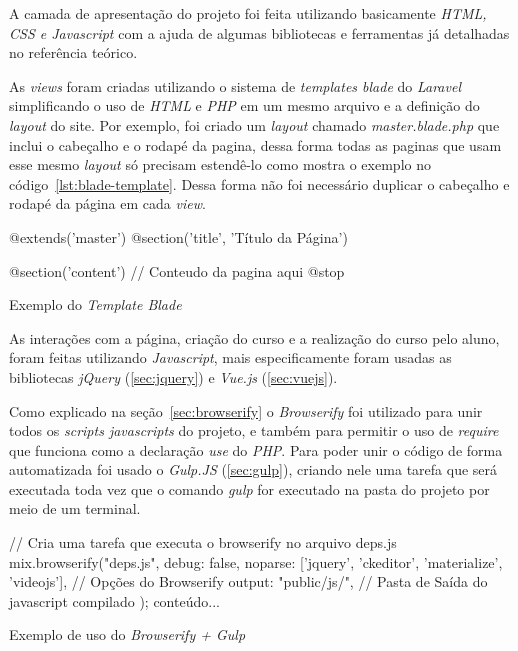 A camada de apresentação do projeto foi feita utilizando basicamente \textit{HTML, CSS e Javascript} com a ajuda de algumas bibliotecas e ferramentas já detalhadas no referência teórico.

As \textit{views} foram criadas utilizando o sistema de \textit{templates blade} do \textit{Laravel} simplificando o uso de \textit{HTML} e \textit{PHP} em um mesmo arquivo e a definição do \textit{layout} do site. Por exemplo, foi criado um \textit{layout} chamado \textit{master.blade.php} que inclui o cabeçalho e o rodapé da pagina, dessa forma todas as paginas que usam esse mesmo \textit{layout} só precisam estendê-lo como mostra o exemplo no código~\ref{lst:blade-template}. Dessa forma não foi necessário duplicar o cabeçalho e rodapé da página em cada \textit{view}.

\begin{listing}
    \begin{phpcode}
        @extends('master')
        @section('title', 'Título da Página')
        
        @section('content')
        // Conteudo da pagina aqui
        @stop
    \end{phpcode}
    \caption{Exemplo do \textit{Template Blade}}
    \label{lst:blade-template}
\end{listing}

As interações com a página, criação do curso e a realização do curso pelo aluno, foram feitas utilizando \textit{Javascript}, mais especificamente foram usadas as bibliotecas \textit{jQuery} (\autoref{sec:jquery}) e \textit{Vue.js} (\autoref{sec:vuejs}).

Como explicado na seção~\autoref{sec:browserify} o \textit{Browserify} foi utilizado para unir todos os \textit{scripts javascripts} do projeto, e também para permitir o uso de \textit{require} que funciona como a declaração \textit{use} do \textit{PHP}. Para poder unir o código de forma automatizada foi usado o \textit{Gulp.JS} (\autoref{sec:gulp}), criando nele uma tarefa que será executada toda vez que o comando \textit{gulp} for executado na pasta do projeto por meio de um terminal.

\begin{listing}
    \begin{jscode}
            // Cria uma tarefa que executa o browserify no arquivo deps.js
            mix.browserify("deps.js", {
                debug: false,
                noparse: ['jquery', 'ckeditor', 'materialize', 'videojs'], // Opções do Browserify
                output: "public/js/", // Pasta de Saída do javascript compilado
            });
        conteúdo...
    \end{jscode}
      \caption{Exemplo de uso do \textit{Browserify + Gulp}}
      \label{lst:browserify-gulp}
\end{listing}

